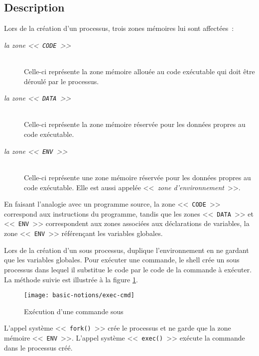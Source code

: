 \subsection{Description}

Lors de la cr{\'e}ation d'un processus, trois zones
m{\'e}moires lui sont affect{\'e}es~:
\begin{description}
	\item[\textsl{la zone <<~\texttt{CODE}~>>}]\mbox{}\\
		Celle-ci repr{\'e}sente la zone m{\'e}moire allou{\'e}e au code ex{\'e}cutable qui
		doit {\^e}tre d{\'e}roul{\'e} par le processus.
	\item[\textsl{la zone <<~\texttt{DATA}~>>}]\mbox{}\\
		Celle-ci repr{\'e}sente la zone m{\'e}moire r{\'e}serv{\'e}e pour les donn{\'e}es propres
		au code ex{\'e}cutable.
	\item[\textsl{la zone <<~\texttt{ENV}~>>}]\mbox{}\\
		Celle-ci repr{\'e}sente une zone m{\'e}moire r{\'e}serv{\'e}e pour les donn{\'e}es propres
		au code ex{\'e}cutable. Elle est aussi appel{\'e}e
		<<~\textsl{zone d'environnement}~>>.
\end{description}
En faisant l'analogie avec un programme source, la zone <<~\texttt{CODE}~>>
correspond aux instructions du programme, tandis que les zones
<<~\texttt{DATA}~>> et <<~\texttt{ENV}~>> correspondent aux zones associ{\'e}es
aux d{\'e}clarations de variables, la zone <<~\texttt{ENV}~>> r{\'e}f{\'e}ren\c{c}ant
les variables globales.

Lors de la cr{\'e}ation d'un sous processus, {\Unix} duplique l'environnement en
ne gardant que les variables globales.
Pour ex{\'e}cuter une commande, le shell cr{\'e}e un sous processus dans lequel
il substitue le code par le code de la commande {\`a} ex{\'e}cuter. La m{\'e}thode suivie est
illustr{\'e}e {\`a} la figure \ref{fig-basnot-exec-cmd}.

\begin{figure}[hbtp]
\centering
\texttt{[image: basic-notions/exec-cmd]}
\caption{\label{fig-basnot-exec-cmd}Ex{\'e}cution d'une commande sous {\Unix}}
\end{figure}

L'appel syst{\`e}me <<~\texttt{fork()}~>> cr{\'e}e le processus et ne garde
que la zone m{\'e}moire <<~\texttt{ENV}~>>. L'appel syst{\`e}me
<<~\texttt{exec()}~>> ex{\'e}cute la commande dans le processus cr{\'e}{\'e}.

